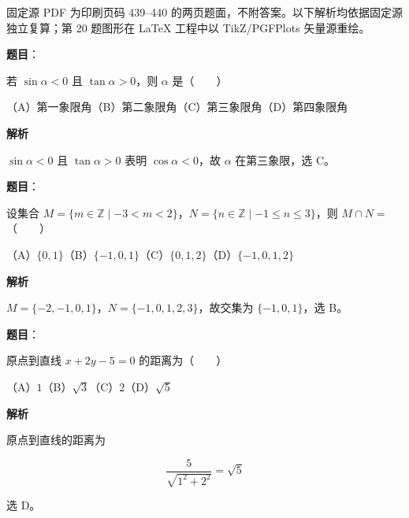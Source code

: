 

\begin{gktip}
固定源 PDF 为印刷页码 439–440 的两页题面，不附答案。以下解析均依据固定源独立复算；第 20 题图形在 LaTeX 工程中以 TikZ/PGFPlots 矢量源重绘。
\end{gktip}

\begin{answer}

\textbf{题目}：

若 $\sin\alpha<0$ 且 $\tan\alpha>0$，则 $\alpha$ 是\mbox{（　　）}

（A）第一象限角\quad（B）第二象限角\quad（C）第三象限角\quad（D）第四象限角

\textbf{解析}

$\sin\alpha<0$ 且 $\tan\alpha>0$ 表明 $\cos\alpha<0$，故 $\alpha$ 在第三象限，选 C。


\end{answer}
\begin{answer}

\textbf{题目}：

设集合 $M=\{m\in\mathbb Z\mid-3<m<2\}$，$N=\{n\in\mathbb Z\mid-1\leqslant n\leqslant3\}$，则 $M\cap N=$\mbox{（　　）}

（A）$\{0,1\}$\quad（B）$\{-1,0,1\}$\quad（C）$\{0,1,2\}$\quad（D）$\{-1,0,1,2\}$

\textbf{解析}

$M=\{-2,-1,0,1\}$，$N=\{-1,0,1,2,3\}$，故交集为 $\{-1,0,1\}$，选 B。


\end{answer}
\begin{answer}

\textbf{题目}：

原点到直线 $x+2y-5=0$ 的距离为\mbox{（　　）}

（A）$1$\quad（B）$\sqrt3$\quad（C）$2$\quad（D）$\sqrt5$

\textbf{解析}

原点到直线的距离为

\nopagebreak[4]
\[
\frac5{\sqrt{1^2+2^2}}=\sqrt5
\]

选 D。


\end{answer}
